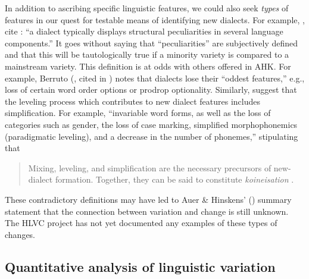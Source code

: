 \documentclass[output=paper]{LSP/langsci}
\begin{document}
In addition to ascribing specific linguistic features, we could also seek \textit{types} of features in our quest for testable means of identifying new dialects. For example, \citet[1]{auer_study_2004}, cite \citet[5]{chambers_dialectology_1998}: “a dialect typically displays structural peculiarities in several language components.” It goes without saying that “peculiarities” are subjectively defined and that this will be tautologically true if a minority variety is compared to a mainstream variety. This definition is at odds with others offered in AHK. For example, Berruto (\citeyear{berruto_fondamenti_1995}, cited in \citealt [11]{auer_study_2004}) notes that dialects lose their “oddest features,” e.g., loss of certain word order options or prodrop optionality. Similarly, \citet[198]{auer_birth_2004} suggest that the leveling process which contributes to new dialect features includes simplification. For example, “invariable word forms, as well as the loss of categories such as gender, the loss of case marking, simplified morphophonemics (paradigmatic leveling), and a decrease in the number of phonemes,” stipulating that

\begin{quote}
Mixing, leveling, and simplification are the necessary precursors of new-dialect formation. Together, they can be said to constitute \textit{koineisation }\citep[199]{auer_study_2004}.
\end{quote}

These contradictory definitions may have led to Auer \& Hinskens' (\citeyear[356]{auer_role_2005}) summary statement that the connection between variation and change is still unknown. The HLVC project has not yet documented any examples of these types of changes.

\subsection{Quantitative analysis of linguistic variation}
\end{document}
